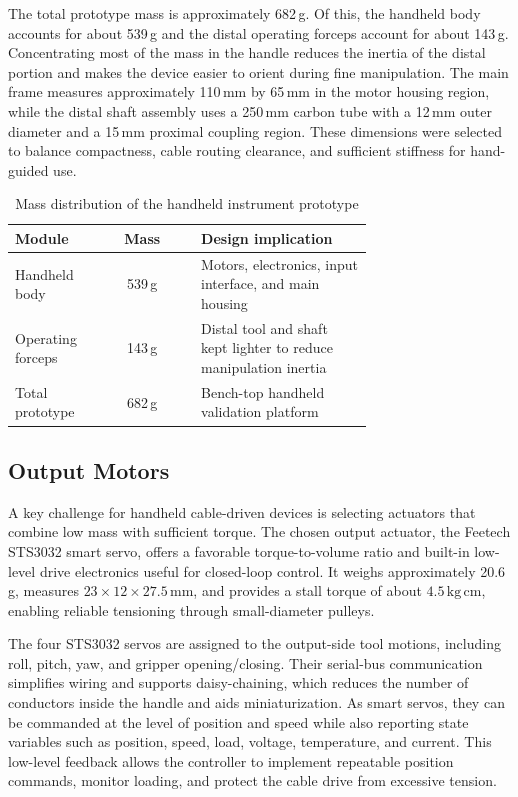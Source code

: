 The total prototype mass is approximately 682\,g. Of this, the handheld body accounts for about 539\,g and the distal operating forceps account for about 143\,g. Concentrating most of the mass in the handle reduces the inertia of the distal portion and makes the device easier to orient during fine manipulation. The main frame measures approximately 110\,mm by 65\,mm in the motor housing region, while the distal shaft assembly uses a 250\,mm carbon tube with a 12\,mm outer diameter and a 15\,mm proximal coupling region. These dimensions were selected to balance compactness, cable routing clearance, and sufficient stiffness for hand-guided use.

\begin{table}[htbp]
    \centering
    \caption{Mass distribution of the handheld instrument prototype}
    \label{tab:mass_distribution}
    \begin{tabular}{p{0.23\linewidth} c p{0.48\linewidth}}
        \toprule
        Module & Mass & Design implication \\
        \midrule
        Handheld body & 539\,g & Motors, electronics, input interface, and main housing \\
        Operating forceps & 143\,g & Distal tool and shaft kept lighter to reduce manipulation inertia \\
        Total prototype & 682\,g & Bench-top handheld validation platform \\
        \bottomrule
    \end{tabular}
\end{table}

\subsection{Output Motors}
A key challenge for handheld cable-driven devices is selecting actuators that combine low mass with sufficient torque. The chosen output actuator, the Feetech STS3032 smart servo, offers a favorable torque-to-volume ratio and built-in low-level drive electronics useful for closed-loop control. It weighs approximately 20.6\,g, measures $23 \times 12 \times 27.5\,\mathrm{mm}$, and provides a stall torque of about $4.5\,\mathrm{kg\,cm}$, enabling reliable tensioning through small-diameter pulleys.

The four STS3032 servos are assigned to the output-side tool motions, including roll, pitch, yaw, and gripper opening/closing. Their serial-bus communication simplifies wiring and supports daisy-chaining, which reduces the number of conductors inside the handle and aids miniaturization. As smart servos, they can be commanded at the level of position and speed while also reporting state variables such as position, speed, load, voltage, temperature, and current. This low-level feedback allows the controller to implement repeatable position commands, monitor loading, and protect the cable drive from excessive tension.
